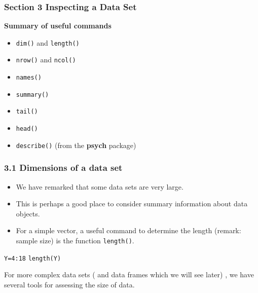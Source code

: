 \documentclass{beamer}
\begin{document}
 	\begin{frame}
 		\frametitle{Section 3 Inspecting a Data Set}
 		\large 
 		\textbf{Summary of useful commands}
 		\begin{itemize}
 			\item \texttt{dim()} and \texttt{length()}
 			\item \texttt{nrow()} and \texttt{ncol()}
 			\item \texttt{names()}
 			\item \texttt{summary()}
 			\item \texttt{tail()}
 			\item \texttt{head()}
 			\item \texttt{describe()} (from the \textbf{psych} package)
 		\end{itemize}
 	\end{frame}
 	\begin{frame}
 		
 		\frametitle{3.1 Dimensions of a data set}
 		\begin{itemize}
 			\item We have remarked that some data sets are very large. 
 			\item This is perhaps a good place to consider
 			summary information about data objects. 
 			\item For a simple vector, a useful command to determine
 			the length (remark: sample size) is the function \texttt{length()}.
 		\end{itemize}
 		\begin{framed}
 			\texttt{Y=4:18}
 			\texttt{length(Y)}
 			
 		\end{framed}
 		For more complex data sets ( and data frames which we will see later) , we have several
 		tools for assessing the size of data.
 	\end{frame}
\end{document}
